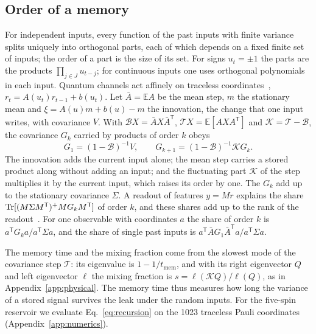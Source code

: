 \subsection{Order of a memory}
\label{sec:order}
For independent inputs, every function of the past inputs with finite variance splits uniquely into orthogonal
parts, each of which depends on a fixed finite set of inputs; the order of a part is the size of its set. For signs
$u_t=\pm1$ the parts are the products $\prod_{j\in J}u_{t-j}$; for continuous inputs one uses orthogonal polynomials
in each input. Quantum channels act affinely on traceless
coordinates~\cite{MartinezPenaOrtega2023,MartinezPenaOrtega2025}, $r_t=A(u_t)r_{t-1}+b(u_t)$. Let $\bar A=\mathbb EA$
be the mean step, $m$ the stationary mean and $\xi=A(u)m+b(u)-m$ the innovation, the change that one input writes,
with covariance $V$. With $\mathcal BX=\bar AX\bar A^{\mathsf T}$, $\mathcal TX=\mathbb E[AXA^{\mathsf T}]$ and
$\mathcal K=\mathcal T-\mathcal B$, the covariance $G_k$ carried by products of order $k$ obeys
\begin{equation}
  G_1=(1-\mathcal B)^{-1}V,\qquad G_{k+1}=(1-\mathcal B)^{-1}\mathcal KG_k .
  \label{eq:recursion}
\end{equation}
The innovation adds the current input alone; the mean step carries a stored product along without adding an input;
and the fluctuating part $\mathcal K$ of the step multiplies it by the current input, which raises its order by one.
The $G_k$ add up to the stationary covariance $\Sigma$. A readout of features $y=Mr$ explains the share
$\operatorname{Tr}[(M\Sigma M^{\mathsf T})^+MG_kM^{\mathsf T}]$ of order $k$, and these shares add up to the rank of the
readout~\cite{Dambre2012}. For one observable with coordinates $a$ the share of order $k$ is
$a^{\mathsf T}G_ka/a^{\mathsf T}\Sigma a$, and the share of single past inputs is
$a^{\mathsf T}\bar AG_1\bar A^{\mathsf T}a/a^{\mathsf T}\Sigma a$.

The memory time and the mixing fraction come from the slowest mode of the covariance step $\mathcal T$: its eigenvalue
is $1-1/t_{\mathrm{mem}}$, and with its right eigenvector $Q$ and left eigenvector $\ell$ the mixing fraction is
$s=\ell(\mathcal KQ)/\ell(Q)$, as in Appendix~\ref{app:physical}. The memory time thus measures how long the variance
of a stored signal survives the leak under the random inputs. For the five-spin reservoir we evaluate
Eq.~\eqref{eq:recursion} on the 1023 traceless Pauli coordinates (Appendix~\ref{app:numerics}).

